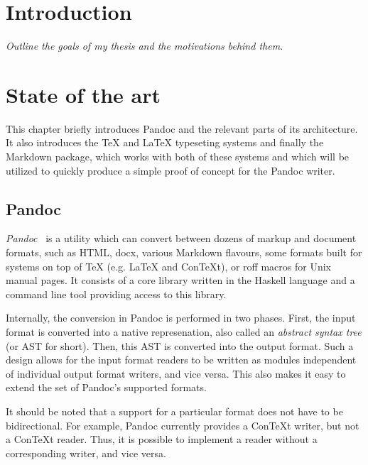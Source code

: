 \documentclass[
  digital,     %
  oneside,     %
  nosansbold,  %
  nocolorbold, %
  lof,         %
  lot,         %
]{fithesis4}
\begin{document}

\chapter{Introduction}
\emph{Outline the goals of my thesis and the motivations behind them.}

\chapter{State of the art}
This chapter briefly introduces Pandoc and the relevant parts of its architecture. It also introduces the \TeX{} and \LaTeX{} typeseting systems and finally the Markdown package, which works with both of these systems and which will be utilized to quickly produce a simple proof of concept for the Pandoc writer.

\section{Pandoc}
\emph{Pandoc}~\cite{pandoc} is a utility which can convert between dozens of markup and document formats, such as HTML, docx, various Markdown flavours, some formats built for systems on top of \TeX{} (e.g. \LaTeX{} and Con\TeX{}t), or roff macros for Unix manual pages. It consists of a core library written in the Haskell language and a command line tool providing access to this library.

Internally, the conversion in Pandoc is performed in two phases. First, the input format is converted into a native represenation, also called an \emph{abstract syntax tree} (or AST for short). Then, this AST is converted into the output format. Such a design allows for the input format readers to be written as modules independent of individual output format writers, and vice versa. This also makes it easy to extend the set of Pandoc's supported formats.

It should be noted that a support for a particular format does not have to be bidirectional. For example, Pandoc currently provides a Con\TeX{}t writer, but not a Con\TeX{}t reader. Thus, it is possible to implement a reader without a corresponding writer, and vice versa.
\end{document}
